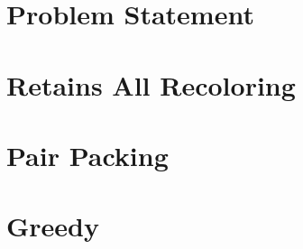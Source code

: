 \documentclass{beamer}
\begin{document}


\section{Problem Statement}



\section{Retains All Recoloring}





\section{Pair Packing}



\section{Greedy}

\end{document}
